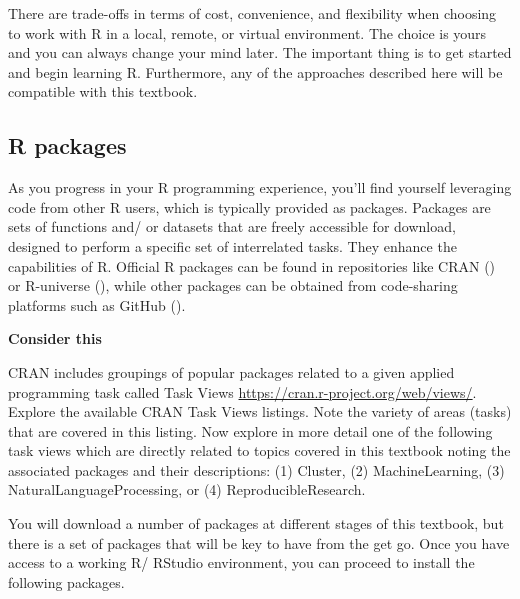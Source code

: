\documentclass[
  letterpaper,
  krantz1]{latex/krantz-mod}
\theoremstyle{definition}
\theoremstyle{definition}
\theoremstyle{remark}
\begin{document}
There are trade-offs in terms of cost, convenience, and flexibility when
choosing to work with R in a local, remote, or virtual environment. The
choice is yours and you can always change your mind later. The important
thing is to get started and begin learning R. Furthermore, any of the
approaches described here will be compatible with this textbook.

\subsection*{R packages}\label{sec-preface-r-packages}

As you progress in your R programming experience, you'll find yourself
leveraging code from other R users, which is typically provided as
packages. Packages are sets of functions and/ or datasets that are
freely accessible for download, designed to perform a specific set of
interrelated tasks. They enhance the capabilities of R. Official R
packages can be found in repositories like CRAN
() or R-universe
(), while other packages can
be obtained from code-sharing platforms such as GitHub
().

\begin{tcolorbox}[enhanced jigsaw, leftrule=.75mm, colframe=quarto-callout-color-frame, left=2mm, colback=white, toprule=.15mm, breakable, arc=.35mm, opacityback=0, bottomrule=.15mm, rightrule=.15mm]

\textbf{ Consider this}

CRAN includes groupings of popular packages related to a given applied
programming task called Task Views
\url{https://cran.r-project.org/web/views/}. Explore the available CRAN
Task Views listings. Note the variety of areas (tasks) that are covered
in this listing. Now explore in more detail one of the following task
views which are directly related to topics covered in this textbook
noting the associated packages and their descriptions: (1) Cluster, (2)
MachineLearning, (3) NaturalLanguageProcessing, or (4)
ReproducibleResearch.

\end{tcolorbox}

You will download a number of packages at different stages of this
textbook, but there is a set of packages that will be key to have from
the get go. Once you have access to a working R/ RStudio environment,
you can proceed to install the following packages.
\end{document}
